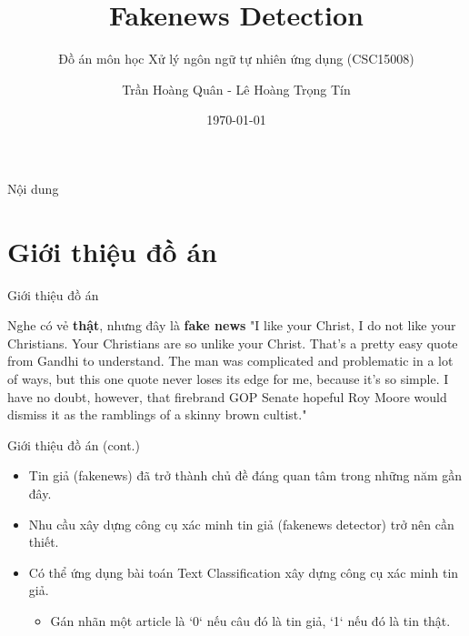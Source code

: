 \documentclass[aspectratio=169,xcolor=dvipsnames]{beamer}
\title[Fakenews Detection]{Fakenews Detection} %
\subtitle{Đồ án môn học Xử lý ngôn ngữ tự nhiên ứng dụng (CSC15008)}
\author[Quan-Tran] {Trần Hoàng Quân - Lê Hoàng Trọng Tín}
\institute[HCMUS] %
{
    Khoa Công nghệ thông tin \\
    Trường Đại học Khoa học Tự nhiên - ĐHQG HCM %
}
\date{\today} %
\begin{document}
\begin{frame}
    \titlepage
\end{frame}

\begin{frame}{Nội dung}
    \tableofcontents
\end{frame}

\section{Giới thiệu đồ án}

\begin{frame}{Giới thiệu đồ án}
\begin{alertblock}{Nghe có vẻ \textbf{thật}, nhưng đây là \textbf{fake news}}
"I like your Christ, I do not like your Christians. Your Christians are so unlike your Christ. That's a pretty easy quote from Gandhi to understand. The man was complicated and problematic in a lot of ways, but this one quote never loses its edge for me, because it's so simple. I have no doubt, however, that firebrand GOP Senate hopeful Roy Moore would dismiss it as the ramblings of a skinny brown cultist."
\end{alertblock}
\end{frame}

\begin{frame}{Giới thiệu đồ án (cont.)}
\begin{itemize}
\item Tin giả (fakenews) đã trở thành chủ đề đáng quan tâm trong những năm gần đây.
\item Nhu cầu xây dựng công cụ xác minh tin giả (fakenews detector) trở nên cần thiết.
\item Có thể ứng dụng bài toán Text Classification xây dựng công cụ xác minh tin giả.
\begin{itemize}
    \item Gán nhãn một article là `0` nếu câu đó là tin giả, `1` nếu đó là tin thật.
\end{itemize}
\end{itemize}
\end{frame}
\end{document}
